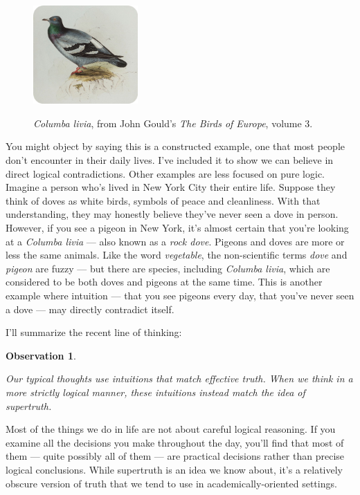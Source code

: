 \documentclass[9pt, twoside]{book}
\newtheorem{obs}{Observation}
\theoremstyle{argtstyle}
\begin{document}
\begin{figure}
    \includegraphics[width=4cm]{rockdove2.png}
    \footnotesize
    \begin{changemargin}{0.5cm}{0.5cm}
        {\em Columba livia}, from John Gould's {\em The Birds of Europe},
        volume 3.
    \end{changemargin}
\end{figure}
You might object by saying this is a constructed example, one that most people
don't
encounter in their daily lives.
I've included it to show we can believe in
direct logical contradictions.
Other examples are less focused on pure logic.
Imagine a person who's lived in New York City their entire
life. Suppose they think of doves as white birds, symbols of peace and
cleanliness. With that understanding, they may honestly believe they've
never seen a dove in person. However, if you see a pigeon in New York, it's
almost certain that you're looking at a {\em Columba livia} --- also known as a
{\em rock dove}.
Pigeons and doves are more or less the same animals.
Like the word {\em vegetable}, the non-scientific terms {\em dove} and
{\em pigeon} are fuzzy ---
but there are species, including {\em Columba livia},
which are considered to be both doves and pigeons at the same time.
This is another example
where intuition --- that you see pigeons every day, that you've never seen
a dove --- may directly contradict itself.

I'll summarize the recent line of thinking:
\newcommand{\obsten}{
    Our typical thoughts use intuitions that match effective truth.
    When we think in a more strictly logical manner, these intuitions
    instead match the idea of supertruth.
}
\begin{obs}\label{o10}
    \obsten
\end{obs}
Most of the things we do in life are not about careful logical reasoning. If you
examine all the decisions you make throughout
the day, you'll find that most of them --- quite possibly all of them --- 
are practical decisions rather than precise logical conclusions.
While supertruth is an idea we know
about, it's a relatively obscure version of truth that we tend to use
in academically-oriented settings.
\end{document}
